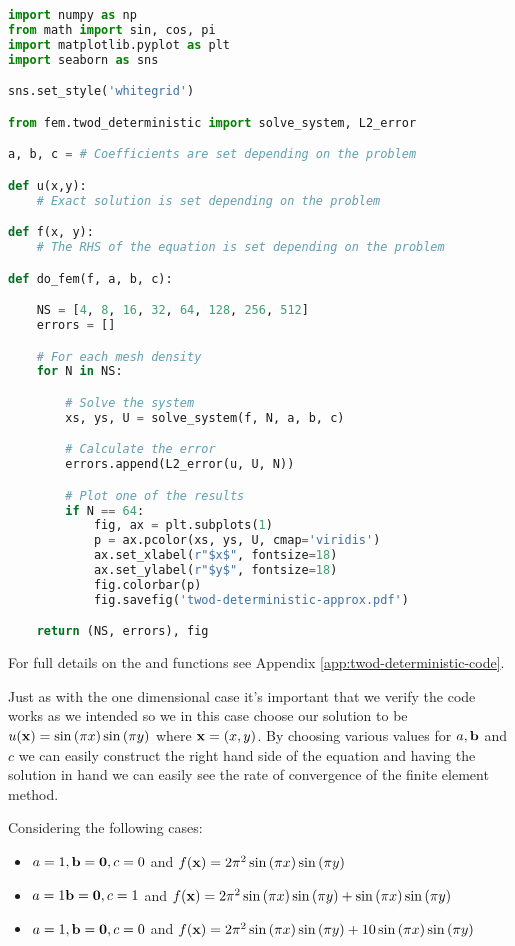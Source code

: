 \begin{lstlisting}[language=Python,
                   caption={Setup code for the 2D Deterministic Finite Element
                            Method},
                   label={code:twod-deterministic}]
import numpy as np
from math import sin, cos, pi
import matplotlib.pyplot as plt
import seaborn as sns

sns.set_style('whitegrid')

from fem.twod_deterministic import solve_system, L2_error

a, b, c = # Coefficients are set depending on the problem

def u(x,y):
    # Exact solution is set depending on the problem

def f(x, y):
    # The RHS of the equation is set depending on the problem

def do_fem(f, a, b, c):

    NS = [4, 8, 16, 32, 64, 128, 256, 512]
    errors = []

    # For each mesh density
    for N in NS:

        # Solve the system
        xs, ys, U = solve_system(f, N, a, b, c)

        # Calculate the error
        errors.append(L2_error(u, U, N))

        # Plot one of the results
        if N == 64:
            fig, ax = plt.subplots(1)
            p = ax.pcolor(xs, ys, U, cmap='viridis')
            ax.set_xlabel(r"$x$", fontsize=18)
            ax.set_ylabel(r"$y$", fontsize=18)
            fig.colorbar(p)
            fig.savefig('twod-deterministic-approx.pdf')

    return (NS, errors), fig
\end{lstlisting}

For full details on the  and  functions
see Appendix \ref{app:twod-deterministic-code}.

Just as with the one dimensional case it's important that we verify the code
works as we intended so we in this case choose our solution to be
$u(\mathbf{x}) = \sin{(\pi x)}\sin{(\pi y)}$ where $\mathbf{x} = (x, y)$. By choosing
various values for $a, \mathbf{b}$ and $c$ we can easily construct the right hand
side of the equation and having the solution in hand we can easily see the rate
of convergence of the finite element method.

Considering the following cases:
\begin{itemize}
    \item $a = 1, \mathbf{b} = \mathbf{0}, c = 0$ and
          $f(\mathbf{x}) = 2\pi^2\sin{(\pi x)}\sin{(\pi y})$
    \item $a = 1 \mathbf{b} = \mathbf{0}, c = 1$ and
          $f(\mathbf{x}) = 2\pi^2\sin{(\pi x)}\sin{(\pi y)} +
                \sin{(\pi x)}\sin{(\pi y)}$
    \item $a = 1, \mathbf{b} = \mathbf{0}, c = 0$ and
          $f(\mathbf{x}) = 2\pi^2\sin{(\pi x)}\sin{(\pi y)} +
                10\sin{(\pi x)}\sin{(\pi y)}$
\end{itemize}

